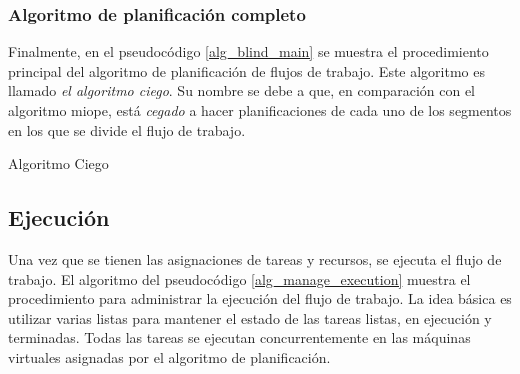 \subsubsection{Algoritmo de planificación completo}

Finalmente, en el pseudocódigo \ref{alg_blind_main} se muestra el procedimiento principal del algoritmo de planificación de flujos de trabajo. Este algoritmo es llamado \emph{el algoritmo ciego}. Su nombre se debe a que, en comparación con el algoritmo miope, está \emph{cegado} a hacer planificaciones de cada uno de los segmentos en los que se divide el flujo de trabajo.

\begin{algorithm}
\caption{Algoritmo Ciego}
\label{alg_blind_main}
\begin{algorithmic}
	\EndFor
\EndProcedure
\end{algorithmic}
\end{algorithm}


\subsection{Ejecución}

Una vez que se tienen las asignaciones de tareas y recursos, se ejecuta el flujo de trabajo. El algoritmo del pseudoc\'odigo \ref{alg_manage_execution} muestra el procedimiento para administrar la ejecuci\'on del flujo de trabajo. La idea b\'asica es utilizar varias listas para mantener el estado de las tareas listas, en ejecuci\'on y terminadas. Todas las tareas se ejecutan concurrentemente en las máquinas virtuales asignadas por el algoritmo de planificaci\'on.

